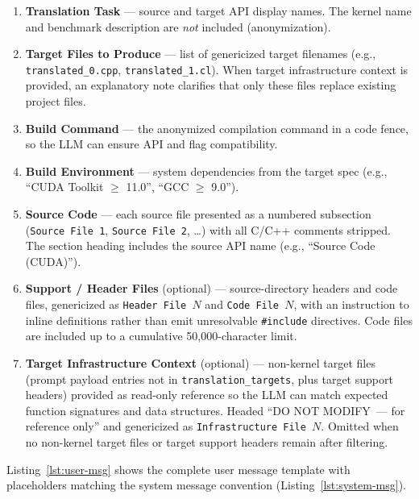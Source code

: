 \begin{enumerate}
  \item \textbf{Translation Task} --- source and target API display names. The kernel name and benchmark description are \emph{not} included (anonymization).
  \item \textbf{Target Files to Produce} --- list of genericized target filenames (e.g., \texttt{translated\_0.cpp}, \texttt{translated\_1.cl}). When target infrastructure context is provided, an explanatory note clarifies that only these files replace existing project files.
  \item \textbf{Build Command} --- the anonymized compilation command in a code fence, so the LLM can ensure API and flag compatibility.
  \item \textbf{Build Environment} --- system dependencies from the target spec (e.g., ``CUDA Toolkit $\geq$ 11.0'', ``GCC $\geq$ 9.0'').
  \item \textbf{Source Code} --- each source file presented as a numbered subsection (\texttt{Source File 1}, \texttt{Source File 2}, \ldots) with all C/C++ comments stripped. The section heading includes the source API name (e.g., ``Source Code (CUDA)'').
  \item \textbf{Support / Header Files} (optional) --- source-directory headers and code files, genericized as \texttt{Header File~$N$} and \texttt{Code File~$N$}, with an instruction to inline definitions rather than emit unresolvable \texttt{\#include} directives. Code files are included up to a cumulative 50{,}000-character limit.
  \item \textbf{Target Infrastructure Context} (optional) --- non-kernel target files (prompt payload entries not in \texttt{translation\_targets}, plus target support headers) provided as read-only reference so the LLM can match expected function signatures and data structures. Headed ``DO NOT MODIFY~--- for reference only'' and genericized as \texttt{Infrastructure File~$N$}. Omitted when no non-kernel target files or target support headers remain after filtering.
\end{enumerate}

\noindent Listing~\ref{lst:user-msg} shows the complete user message template with placeholders matching the system message convention
(Listing~\ref{lst:system-msg}).

